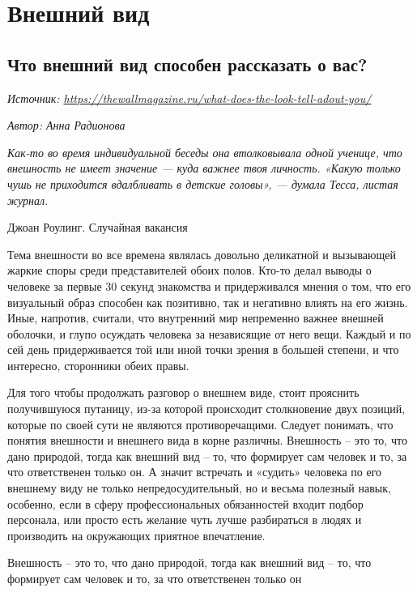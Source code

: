 \chapter{Внешний вид}

\section{Что внешний вид способен рассказать о вас?}

\textit{Источник: \url{https://thewallmagazine.ru/what-does-the-look-tell-adout-you/}}

\textit{Автор: Анна Радионова}

\begin{flushright}
    \it Как-то во время индивидуальной беседы она втолковывала одной ученице, что внешность не имеет значение — куда важнее твоя личность. «Какую только чушь не приходится вдалбливать в детские головы», — думала Тесса, листая журнал.

    Джоан Роулинг. Случайная вакансия
\end{flushright}

Тема внешности во все времена являлась довольно деликатной и вызывающей жаркие споры среди представителей обоих полов. Кто-то делал выводы о человеке за первые 30 секунд знакомства и  придерживался мнения о том, что его визуальный образ способен как позитивно, так и негативно влиять на его жизнь. Иные, напротив, считали, что внутренний мир непременно важнее внешней оболочки, и глупо осуждать человека за независящие от него вещи. Каждый и по сей день придерживается той или иной точки зрения в большей степени, и что интересно, сторонники обеих правы.

Для того чтобы продолжать разговор о внешнем виде, стоит прояснить получившуюся путаницу, из-за которой происходит столкновение двух позиций, которые по своей сути не являются противоречащими. Следует понимать, что понятия внешности и внешнего вида в корне различны. Внешность – это то, что дано природой, тогда как внешний вид – то, что формирует сам человек и то, за что ответственен только он. А значит встречать и «судить» человека по его внешнему виду не только непредосудительный, но и весьма полезный навык, особенно, если в сферу профессиональных обязанностей входит подбор персонала, или просто есть желание чуть лучше разбираться в людях и  производить на окружающих приятное впечатление.

\begin{fancyquotes}
    Внешность – это то, что дано природой, тогда как внешний вид – то, что формирует сам человек и то, за что ответственен только он
\end{fancyquotes}

